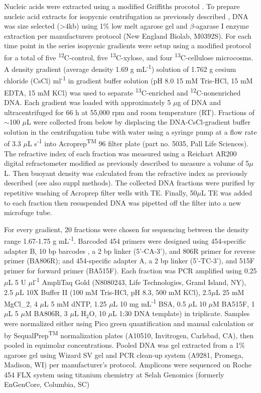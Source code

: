 Nucleic acids were extracted using a modified Griffiths procotol \cite{Griffiths_2000}. To prepare nucleic acid extracts for isopycnic centrifugation as previously described \cite{Buckley_2007}, DNA was size selected (\textgreater 4kb) using 1\% low melt agarose gel and $\beta$-agarase I enzyme extraction per manufacturers protocol (New England Biolab, M0392S). For each time point in the series isopycnic gradients were setup using a modified protocol \cite{Neufeld_2007} for a total of five \textsuperscript{12}C-control, five \textsuperscript{13}C-xylose, and four \textsuperscript{13}C-cellulose microcosms. A density gradient (average density 1.69 g mL\textsuperscript{-1}) solution of 1.762 g cesium chloride (CsCl) ml\textsuperscript{-1} in gradient buffer solution (pH 8.0 15 mM Tris-HCl, 15 mM EDTA, 15 mM KCl) was used to separate \textsuperscript{13}C-enriched and \textsuperscript{12}C-nonenriched DNA. Each gradient was loaded with approximately 5 $\mu$g of DNA and ultracentrifuged for 66 h at 55,000 rpm and room temperature (RT). Fractions of $\sim$100 $\mu$L were collected from below by displacing the DNA-CsCl-gradient buffer solution in the centrifugation tube with water using a syringe pump at a flow rate of 3.3 $\mu$L s\textsuperscript{-1} \cite{Manefield_2002} into Acroprep\textsuperscript{TM} 96 filter plate (part no. 5035, Pall Life Sciences). The refractive index of each fraction was measured using a Reichart AR200 digital refractometer modified as previously described \cite{Buckley_2007} to measure a volume of 5$\mu$L. Then buoyant density was calculated from the refractive index as previously described \cite{Buckley_2007} (see also suppl methods). The collected DNA fractions were purified by repetitive washing of Acroprep filter wells with TE. Finally, 50$\mu$L TE was added to each fraction then resuspended DNA was pipetted off the filter into a new microfuge tube. 


For every gradient, 20 fractions were chosen for sequencing between the density range 1.67-1.75 g mL\textsuperscript{-1}. Barcoded 454 primers were designed using 454-specific adapter B, 10 bp barcodes \cite{Hamady_2008}, a 2 bp linker (5'-CA-3'), and 806R primer for reverse primer (BA806R); and 454-specific adapter A, a 2 bp linker  (5'-TC-3'), and 515F primer for forward primer (BA515F). Each fraction was PCR amplified using 0.25 $\mu$L 5 U $\mu$l\textsuperscript{-1} AmpliTaq Gold (N8080243, Life Technologies, Grand Island, NY), 2.5 $\mu$L 10X Buffer II (100 mM Tris-HCl, pH 8.3, 500 mM KCl), 2.5$\mu$L 25 mM MgCl_{2}, 4 $\mu$L 5 mM dNTP, 1.25 $\mu$L 10 mg mL\textsuperscript{-1} BSA, 0.5 $\mu$L 10 $\mu$M BA515F, 1 $\mu$L 5 $\mu$M BA806R, 3 $\mu$L H$_{2}$O, 10 $\mu$L 1:30 DNA template) in triplicate. Samples were normalized either using Pico green quantification and manual calculation or by SequalPrep\textsuperscript{TM} normalization plates (A10510, Invitrogen, Carlsbad, CA), then pooled in equimolar concentrations.  Pooled DNA was gel extracted from a 1\% agarose gel using Wizard SV gel and PCR clean-up system (A9281, Promega, Madison, WI) per manufacturer's protocol.  Amplicons were sequenced on Roche 454 FLX system using titanium chemistry at Selah Genomics (formerly EnGenCore, Columbia, SC)  
